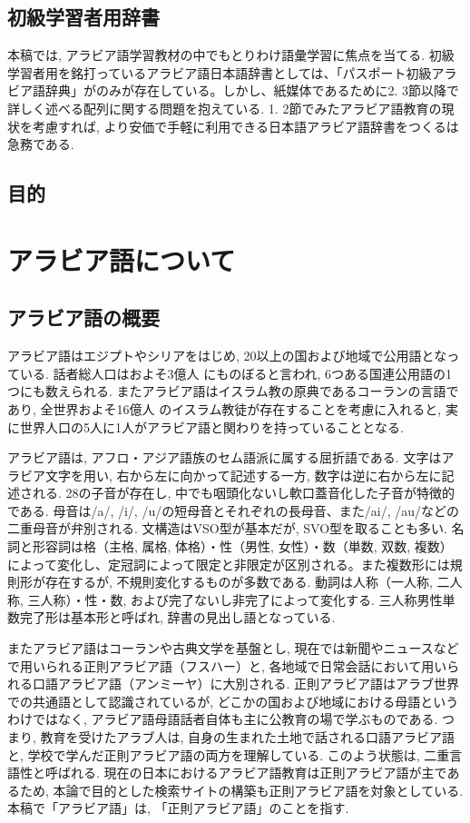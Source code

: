 \documentclass[technicalreport]{ieicej}
\begin{document}
\subsection{初級学習者用辞書}
本稿では, アラビア語学習教材の中でもとりわけ語彙学習に焦点を当てる. 初級学習者用を銘打っているアラビア語日本語辞書としては、「パスポート初級アラビア語辞典」がのみが存在している。しかし、紙媒体であるために2. 3節以降で詳しく述べる配列に関する問題を抱えている.
1. 2節でみたアラビア語教育の現状を考慮すれば, より安価で手軽に利用できる日本語アラビア語辞書をつくるは急務である. 

\subsection{目的}

\section{アラビア語について}
\subsection{アラビア語の概要}
アラビア語はエジプトやシリアをはじめ, 20以上の国および地域で公用語となっている. 話者総人口はおよそ3億人 にものぼると言われ, 6つある国連公用語の1つにも数えられる. またアラビア語はイスラム教の原典であるコーランの言語であり, 全世界およそ16億人 のイスラム教徒が存在することを考慮に入れると, 実に世界人口の5人に1人がアラビア語と関わりを持っていることとなる. 

アラビア語は, アフロ・アジア語族のセム語派に属する屈折語である. 文字はアラビア文字を用い, 右から左に向かって記述する一方, 数字は逆に右から左に記述される. 28の子音が存在し, 中でも咽頭化ないし軟口蓋音化した子音が特徴的である. 母音は/a/, /i/, /u/の短母音とそれぞれの長母音、また/ai/, /au/などの二重母音が弁別される. 文構造はVSO型が基本だが, SVO型を取ることも多い. 名詞と形容詞は格（主格, 属格, 体格）・性（男性, 女性）・数（単数, 双数, 複数）によって変化し、定冠詞によって限定と非限定が区別される。また複数形には規則形が存在するが, 不規則変化するものが多数である. 動詞は人称（一人称, 二人称, 三人称）・性・数, および完了ないし非完了によって変化する. 三人称男性単数完了形は基本形と呼ばれ, 辞書の見出し語となっている.

またアラビア語はコーランや古典文学を基盤とし, 現在では新聞やニュースなどで用いられる正則アラビア語（フスハー）と, 各地域で日常会話において用いられる口語アラビア語（アンミーヤ）に大別される. 正則アラビア語はアラブ世界での共通語として認識されているが, どこかの国および地域における母語というわけではなく, アラビア語母語話者自体も主に公教育の場で学ぶものである. つまり, 教育を受けたアラブ人は, 自身の生まれた土地で話される口語アラビア語と, 学校で学んだ正則アラビア語の両方を理解している. このよう状態は, 二重言語性と呼ばれる. 現在の日本におけるアラビア語教育は正則アラビア語が主であるため, 本論で目的とした検索サイトの構築も正則アラビア語を対象としている. 本稿で「アラビア語」は, 「正則アラビア語」のことを指す. 
\end{document}
